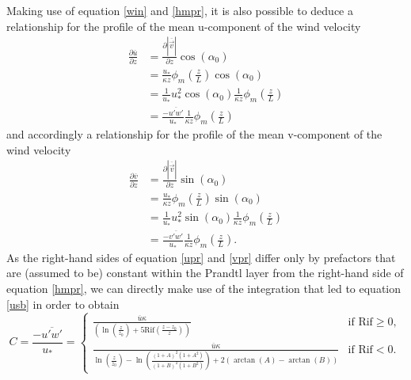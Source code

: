 \documentclass[11pt,a4paper,titlepage]{scrreprt}
\begin{document}
Making use of equation \ref{win} and \ref{hmpr}, it is also possible to deduce a relationship for the profile of the mean u-component of the wind velocity
\begin{equation} \label{upr}
\begin{split}
\frac{\partial \overline{u} }{\partial z} &= \frac{\partial \left | \overline{\vec{v}} \right |}{\partial z} \cos \left ( \alpha_0 \right ) \\
                                          &= \frac{u_{\ast}}{\kappa z} \phi_m \left ( \frac{z}{L} \right ) \cos \left ( \alpha_0 \right ) \\
                                          &= \frac{1}{u_{\ast}} {u^2_{\ast}} \cos \left ( \alpha_0 \right ) \frac{1}{\kappa z} \phi_m \left ( \frac{z}{L} \right ) \\
                                          &= \frac{-\overline{u'w'}}{u_{\ast}} \frac{1}{\kappa z} \phi_m \left ( \frac{z}{L} \right )
\end{split} 
\end{equation}
and accordingly a relationship for the profile of the mean v-component of the wind velocity
\begin{equation} \label{vpr}
\begin{split}
\frac{\partial \overline{v} }{\partial z} &= \frac{\partial \left | \overline{\vec{v}} \right |}{\partial z} \sin \left ( \alpha_0 \right ) \\
                                          &= \frac{u_{\ast}}{\kappa z} \phi_m \left ( \frac{z}{L} \right ) \sin \left ( \alpha_0 \right ) \\
                                          &= \frac{1}{u_{\ast}} {u^2_{\ast}} \sin \left ( \alpha_0 \right ) \frac{1}{\kappa z} \phi_m \left ( \frac{z}{L} \right ) \\
                                          &= \frac{-\overline{v'w'}}{u_{\ast}} \frac{1}{\kappa z} \phi_m \left ( \frac{z}{L} \right ).
\end{split} 
\end{equation}
As the right-hand sides of equation \ref{upr} and \ref{vpr} differ only by prefactors that are (assumed to be) constant within the Prandtl layer from the 
right-hand side of equation \ref{hmpr}, we can directly make use of the integration that led to equation \ref{usb} in order to obtain   
\begin{equation} \label{uswsb}
C=\frac{-\overline{u'w'}}{u_{\ast}} =
\begin{cases}
\frac{\overline{u} \kappa}{\left ( \ln \left ( \frac{z}{z_0} \right ) + 5 \text{Rif} \left ( \frac{z-z_0}{z} \right ) \right )} & \text{if $\text{Rif} \ge 0$}, \\
\frac{ \overline{u} \kappa}{\ln \left ( \frac{z}{z_0} \right ) - \ln \left ( \frac{ \left ( 1+A \right )^2  \left ( 1+A^2 \right ) }{ \left ( 1+B \right )^2  \left ( 1+B^2 \right ) }\right ) + 2 \left ( \arctan(A) - \arctan(B) \right )} & \text{if $\text{Rif}<0$}.

\end{cases} 
\end{equation}
\end{document}
